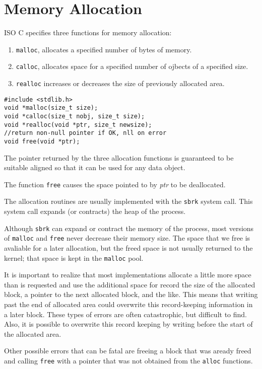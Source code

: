 \documentclass[a4paper,10pt]{book}
\begin{document}
\section{Memory Allocation}
ISO C specifies three functions for memory allocation:
\begin{enumerate}
\item \verb|malloc|, allocates a specified number of bytes of memory.
\item \verb|calloc|, allocates space for a specified number of ojbects of a
specified size. 
\item \verb|realloc| increases or decreases the size of previously allocated
area.
\end{enumerate}
\begin{verbatim}
#include <stdlib.h>
void *malloc(size_t size);
void *calloc(size_t nobj, size_t size);
void *realloc(void *ptr, size_t newsize);
//return non-null pointer if OK, nll on error
void free(void *ptr);
\end{verbatim}
The pointer returned by the three allocation functions is guaranteed to be
suitable aligned so that it can be used for any data object.

The function \verb|free| causes the space pointed to by \emph{ptr} to be
deallocated.

The allocation routines are usually implemented with the \verb|sbrk| system
call. This system call expands (or contracts) the heap of the process.

Although \verb|sbrk| can expand or contract the memory of the process, most
versions of \verb|malloc| and \verb|free| never decrease their memory size. The
space that we free is avaliable for a later allocation, but the freed space is
not usually returned to the kernel; that space is kept in the \verb|malloc|
pool.

It is important to realize that most implementations allocate a little more
space than is requested and use the additional space for record the size of the
allocated block, a pointer to the next allocated block, and the like. This means
that writing past the end of allocated area could overwrite this record-keeping
information in a later block. These types of errors are often catastrophic, but
difficult to find. Also, it is possible to overwrite this record keeping by
writing before the start of the allocated area.

Other possible errors that can be fatal are freeing a block that was aready
freed and calling \verb|free| with a pointer that was not obtained from the
\verb|alloc| functions. 
\end{document}
